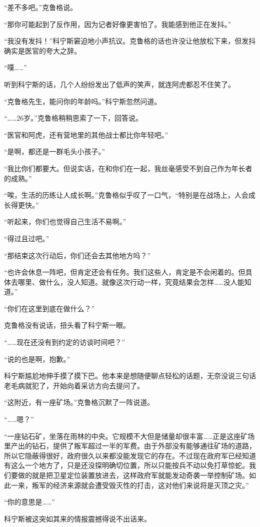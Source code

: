“差不多吧。”克鲁格说。

“那你可能起到了反作用，因为记者好像更害怕了。我能感到他正在发抖。”

“我没有发抖！”科宁斯窘迫地小声抗议。克鲁格的话也许没让他放松下来，但发抖确实是医官的夸大之辞。

“噗……”

听到科宁斯的话，几个人纷纷发出了低声的笑声，就连阿虎都忍不住笑了。

“克鲁格先生，能问你的年龄吗。”科宁斯忽然问道。

“……26岁。”克鲁格稍稍思索了一下，回答说。

“医官和阿虎，还有营地里的其他战士都比你年轻吧。”

“是啊，都还是一群毛头小孩子。”

“我比你们都要大。但说实话，在和你们在一起，我丝毫感受不到自己作为年长者的成熟。”

“唉，生活的历练让人成长啊。”克鲁格似乎叹了一口气，“特别是在战场上，人会成长得更快。”

“听起来，你们也觉得自己生活不易啊。”

“得过且过吧。”

“那结束这次行动后，你们还会去其他地方吗？”

“也许会休息一阵吧，但肯定还会有任务。我们这些人，肯定是不会闲着的。但具体去哪里、做什么，没人知道。就像这次行动一样，究竟结果会怎样……没人能知道。”

“你们在这里到底在做什么？”

克鲁格没有说话，扭头看了科宁斯一眼。

“……现在还没有到约定的访谈时间吧？”

“说的也是啊，抱歉。”

科宁斯尴尬地伸手摸了摸下巴。他本来是想随便聊点轻松的话题，无奈没说三句话老毛病就犯了，开始向着采访方向去提问了。

“这附近，有一座矿场。”克鲁格沉默了一阵说道。

“……嗯？”

“一座钻石矿，坐落在雨林的中央。它规模不大但是储量却很丰富……正是这座矿场里产出的钻石，提供了叛军超过一半的军费。由于外部没有能够通往矿场的道路，所以它隐蔽得很好，政府很久以来都没能发现它的存在。不过现在政府军已经知道有这么一个地方了，只是还没探明确切位置，所以只能按兵不动以免打草惊蛇。我们要做的就是把卫星定位装置放进去，这样政府军就能发动奇袭一举控制矿场。如此一来，叛军的经济来源就会遭受毁灭性的打击，这对他们来说将是灭顶之灾。”

“你的意思是……”

科宁斯被这突如其来的情报震撼得说不出话来。


